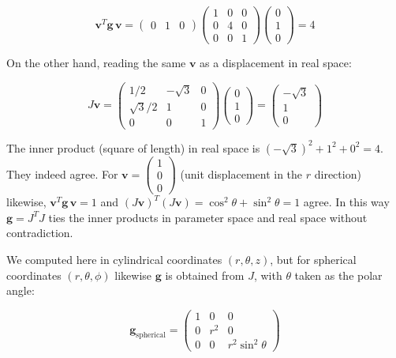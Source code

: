 \documentclass[a4paper,12pt,openany]{book}
\begin{document}
\[\mathbf{v}^T \mathbf{g} \,\mathbf{v} = \begin{pmatrix} 0 & 1 & 0 \end{pmatrix}
\begin{pmatrix} 1 & 0 & 0 \\ 0 & 4 & 0 \\ 0 & 0 & 1 \end{pmatrix}
\begin{pmatrix} 0 \\ 1 \\ 0 \end{pmatrix} = 4\]

On the other hand, reading the same \(\mathbf{v}\) as a displacement in
real space:

\[J\mathbf{v} = \begin{pmatrix}
1/2 & -\sqrt{3} & 0 \\
\sqrt{3}/2 & 1 & 0 \\
0 & 0 & 1
\end{pmatrix}
\begin{pmatrix} 0 \\ 1 \\ 0 \end{pmatrix} = \begin{pmatrix} -\sqrt{3} \\ 1 \\ 0 \end{pmatrix}\]

The inner product (square of length) in real space is
\((-\sqrt{3})^2 + 1^2 + 0^2 = 4\). They indeed agree. For
\(\mathbf{v} = \begin{pmatrix}1 \\ 0 \\ 0\end{pmatrix}\) (unit
displacement in the \(r\) direction) likewise,
\(\mathbf{v}^T \mathbf{g} \,\mathbf{v} = 1\) and
\((J\mathbf{v})^T (J\mathbf{v}) = \cos^2\theta + \sin^2\theta = 1\)
agree. In this way \(\mathbf{g} = J^T J\) ties the inner products in
parameter space and real space without contradiction.

We computed here in cylindrical coordinates \((r,\theta,z)\), but for
spherical coordinates \((r,\theta,\phi)\) likewise \(\mathbf{g}\) is
obtained from \(J\), with \(\theta\) taken as the polar angle:

\[\mathbf{g}_{\text{spherical}} = \begin{pmatrix} 1 & 0 & 0 \\ 0 & r^2 & 0 \\ 0 & 0 & r^2\sin^2\theta \end{pmatrix}\]
\end{document}
